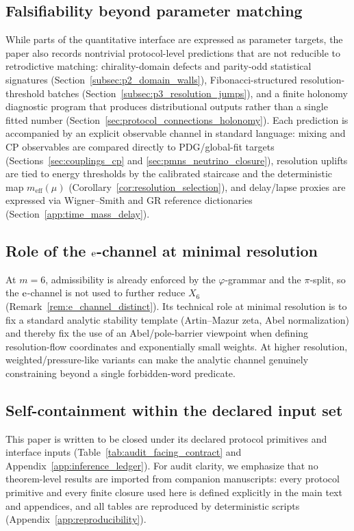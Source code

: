 \subsection{Falsifiability beyond parameter matching}
While parts of the quantitative interface are expressed as parameter targets, the paper also records nontrivial protocol-level predictions that are not reducible to retrodictive matching:
chirality-domain defects and parity-odd statistical signatures (Section~\ref{subsec:p2_domain_walls}),
Fibonacci-structured resolution-threshold batches (Section~\ref{subsec:p3_resolution_jumps}),
and a finite holonomy diagnostic program that produces distributional outputs rather than a single fitted number (Section~\ref{sec:protocol_connections_holonomy}).
Each prediction is accompanied by an explicit observable channel in standard language: mixing and CP observables are compared directly to PDG/global-fit targets (Sections~\ref{sec:couplings_cp} and \ref{sec:pmns_neutrino_closure}), resolution uplifts are tied to energy thresholds by the calibrated staircase and the deterministic map $m_{\mathrm{eff}}(\mu)$ (Corollary~\ref{cor:resolution_selection}), and delay/lapse proxies are expressed via Wigner--Smith and GR reference dictionaries (Section~\ref{app:time_mass_delay}).

\subsection{Role of the \texorpdfstring{$\mathrm{e}$}{e}-channel at minimal resolution}
At $m=6$, admissibility is already enforced by the $\varphi$-grammar and the $\pi$-split, so the $\mathrm{e}$-channel is not used to further reduce $X_6$ (Remark~\ref{rem:e_channel_distinct}).
Its technical role at minimal resolution is to fix a standard analytic stability template (Artin--Mazur zeta, Abel normalization) and thereby fix the use of an Abel/pole-barrier viewpoint when defining resolution-flow coordinates and exponentially small weights.
At higher resolution, weighted/pressure-like variants can make the analytic channel genuinely constraining beyond a single forbidden-word predicate.

\subsection{Self-containment within the declared input set}
This paper is written to be closed under its declared protocol primitives and interface inputs (Table~\ref{tab:audit_facing_contract} and Appendix~\ref{app:inference_ledger}).
For audit clarity, we emphasize that no theorem-level results are imported from companion manuscripts: every protocol primitive and every finite closure used here is defined explicitly in the main text and appendices, and all tables are reproduced by deterministic scripts (Appendix~\ref{app:reproducibility}).

